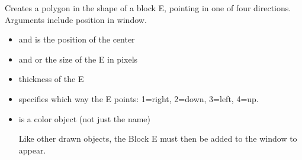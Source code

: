 \documentclass[letterpaper,10pt,english]{sphinxmanual}
\begin{document}
\sphinxAtStartPar
{}

\sphinxAtStartPar
Creates a polygon in the shape of a  block E, pointing in one of four directions. Arguments include position in window.
\begin{itemize}
\item {} 
\sphinxAtStartPar
{} and  is the position of the center

\item {} 
\sphinxAtStartPar
{} and  or the size of the E in pixels

\item {} 
\sphinxAtStartPar
{} thickness of the E

\item {} 
\sphinxAtStartPar
{} specifies which way the E points:  1=right,   2=down, 3=left, 4=up.

\item {} 
\sphinxAtStartPar
{} is a color object (not just the name)

\sphinxAtStartPar
Like other drawn objects, the Block E must then be added to the window to appear.

\end{itemize}

\sphinxAtStartPar
{}

\begin{sphinxVerbatim}[commandchars=\\\{\}]
\end{sphinxVerbatim}

\sphinxAtStartPar
{}

\begin{sphinxVerbatim}[commandchars=\\\{\}]
\end{sphinxVerbatim}
\end{document}
